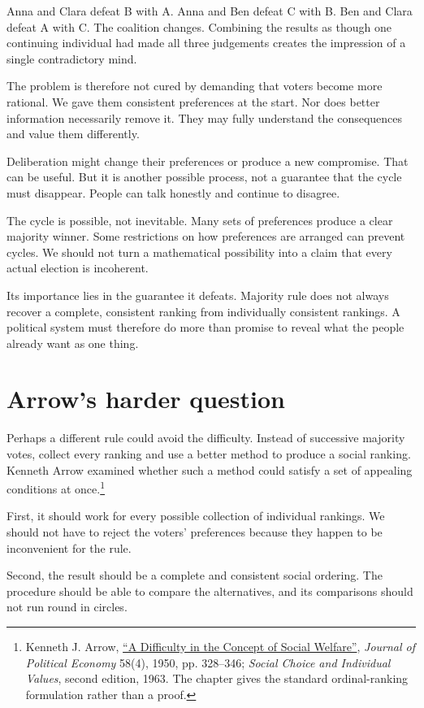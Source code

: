 \documentclass[12pt,a4paper]{book}
\begin{document}
Anna and Clara defeat B with A. Anna and Ben defeat C with B. Ben and Clara defeat A with C. The coalition changes. Combining the results as though one continuing individual had made all three judgements creates the impression of a single contradictory mind.

The problem is therefore not cured by demanding that voters become more rational. We gave them consistent preferences at the start. Nor does better information necessarily remove it. They may fully understand the consequences and value them differently.

Deliberation might change their preferences or produce a new compromise. That can be useful. But it is another possible process, not a guarantee that the cycle must disappear. People can talk honestly and continue to disagree.

The cycle is possible, not inevitable. Many sets of preferences produce a clear majority winner. Some restrictions on how preferences are arranged can prevent cycles. We should not turn a mathematical possibility into a claim that every actual election is incoherent.

Its importance lies in the guarantee it defeats. Majority rule does not always recover a complete, consistent ranking from individually consistent rankings. A political system must therefore do more than promise to reveal what the people already want as one thing.

\section*{Arrow's harder question}

Perhaps a different rule could avoid the difficulty. Instead of successive majority votes, collect every ranking and use a better method to produce a social ranking. Kenneth Arrow examined whether such a method could satisfy a set of appealing conditions at once.\footnote{Kenneth J. Arrow, \href{https://www.journals.uchicago.edu/doi/abs/10.1086/256963}{``A Difficulty in the Concept of Social Welfare''}, \emph{Journal of Political Economy} 58(4), 1950, pp. 328--346; \emph{Social Choice and Individual Values}, second edition, 1963. The chapter gives the standard ordinal-ranking formulation rather than a proof.}

First, it should work for every possible collection of individual rankings. We should not have to reject the voters' preferences because they happen to be inconvenient for the rule.

Second, the result should be a complete and consistent social ordering. The procedure should be able to compare the alternatives, and its comparisons should not run round in circles.
\end{document}
